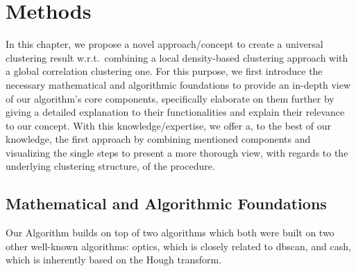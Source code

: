 \chapter{Methods}\label{ch:Methods}
In this chapter, we propose a novel approach/concept to create a universal clustering result w.r.t.\ combining a local density-based clustering approach with a global correlation clustering one. For this purpose, we first introduce the necessary mathematical and algorithmic foundations to provide an in-depth view of our algorithm's core components, specifically elaborate on them further by giving a detailed explanation to their functionalities and explain their relevance to our concept. With this knowledge/expertise, we offer a, to the best of our knowledge, the first approach by combining mentioned components and visualizing the single steps to present a more thorough view, with regards to the underlying clustering structure, of the procedure. 



\section{Mathematical and Algorithmic Foundations}
\label{sec:Foundations}
Our Algorithm builds on top of two algorithms which both were built on two other well-known algorithms: \gls{optics}, which is closely related to \gls{dbscan}, and \gls{cash}, which is inherently based on the Hough transform.

